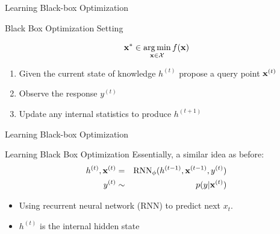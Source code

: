 \begin{frame}[c]{Learning Black-box Optimization~}

\begin{block}{Black Box Optimization Setting}

\begin{equation}
\mathbf{x}^* \in \operatorname*{arg\,min}_{\mathbf{x} \in \mathcal{X}} f(\mathbf{x}) \nonumber
\end{equation}
	
\begin{enumerate}
\item Given the current state of knowledge $h^{(t)}$ propose a query point $\mathbf{x}^{(t)}$
\item Observe the response $y^{(t)}$
\item Update any internal statistics to produce $h^{(t+1)}$
\end{enumerate}
\end{block}


\end{frame}
\begin{frame}[c]{Learning Black-box Optimization~}


\begin{block}{Learning Black Box Optimization}
	Essentially, a similar idea as before:
	\begin{eqnarray}
	h^{(t)}, \mathbf{x}^{(t)} &=& \text{RNN}_\phi(h^{(t-1)}, \mathbf{x}^{(t-1)}, y^{(t)}) \nonumber \\
	y^{(t)} &\sim& p(y|\mathbf{x}^{(t)})\nonumber
	\end{eqnarray}
	
	\begin{itemize}
		\item Using recurrent neural network (RNN) to predict next $x_t$.
		\item $h^{(t)}$ is the internal hidden state 
	\end{itemize}
	
\end{block}



\end{frame}
